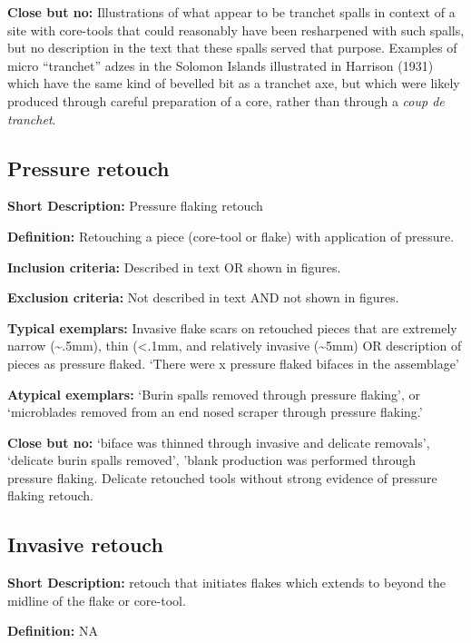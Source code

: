 \documentclass[
]{article}
\begin{document}
\textbf{Close but no:} Illustrations of what appear to be tranchet
spalls in context of a site with core-tools that could reasonably have
been resharpened with such spalls, but no description in the text that
these spalls served that purpose. Examples of micro ``tranchet'' adzes
in the Solomon Islands illustrated in Harrison (1931) which have the
same kind of bevelled bit as a tranchet axe, but which were likely
produced through careful preparation of a core, rather than through a
\emph{coup de tranchet}.

\hypertarget{pressure-retouch}{%
\subsection{Pressure retouch}\label{pressure-retouch}}

\textbf{Short Description:} Pressure flaking retouch

\textbf{Definition:} Retouching a piece (core-tool or flake) with
application of pressure.

\textbf{Inclusion criteria:} Described in text OR shown in figures.

\textbf{Exclusion criteria:} Not described in text AND not shown in
figures.

\textbf{Typical exemplars:} Invasive flake scars on retouched pieces
that are extremely narrow (\textasciitilde.5mm), thin (\textless.1mm,
and relatively invasive (\textasciitilde5mm) OR description of pieces as
pressure flaked. `There were x pressure flaked bifaces in the
assemblage'

\textbf{Atypical exemplars:} `Burin spalls removed through pressure
flaking', or `microblades removed from an end nosed scraper through
pressure flaking.'

\textbf{Close but no:} `biface was thinned through invasive and delicate
removals', `delicate burin spalls removed', 'blank production was
performed through pressure flaking. Delicate retouched tools without
strong evidence of pressure flaking retouch.

\hypertarget{invasive-retouch}{%
\subsection{Invasive retouch}\label{invasive-retouch}}

\textbf{Short Description:} retouch that initiates flakes which extends
to beyond the midline of the flake or core-tool.

\textbf{Definition:} NA
\end{document}
